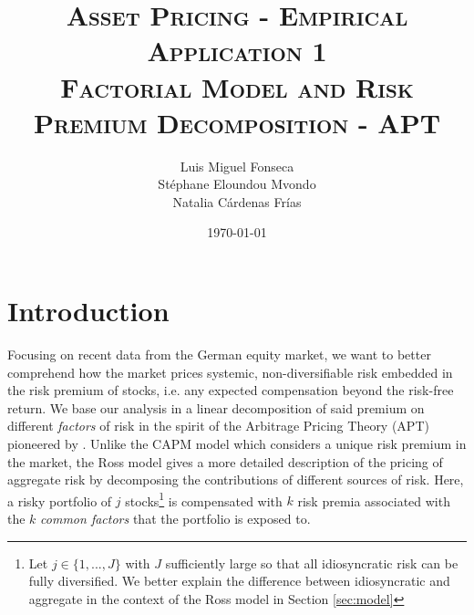 \documentclass[hidelinks,11pts]{article}
\DeclareMathOperator{\1}{\mathbbm{1}}
\begin{document}
        \title{\scshape{Asset Pricing - Empirical Application 1\\Factorial Model and Risk Premium Decomposition - APT }}%
        \author{Luis Miguel Fonseca \\ Stéphane Eloundou Mvondo\\ Natalia Cárdenas Frías }
        \date{\today}
        \maketitle 




\section*{Introduction}

Focusing on recent data from the German equity market, we want to better comprehend how the market prices systemic, non-diversifiable risk embedded in the risk premium of stocks, i.e. any expected compensation beyond the risk-free return.
We base our analysis in a linear decomposition of said premium on different \emph{factors} of risk in the spirit of the Arbitrage Pricing Theory (APT) pioneered by \cite{rossArbitrageTheoryCapital1976}. 
Unlike the CAPM model which considers a unique risk premium in the market, the Ross model gives a more detailed description of the pricing of aggregate risk by decomposing the contributions of different sources of risk. 
Here, a risky portfolio of $j$ stocks\footnote{Let $j \in \{1,...,J\}$ with $J$ sufficiently large so that all idiosyncratic risk can be fully diversified. We better explain the difference between idiosyncratic and aggregate in the context of the Ross model in Section \ref{sec:model}} is compensated with  $k$ risk premia associated with the $k$ \emph{common factors} that the portfolio is exposed to.
\end{document}
